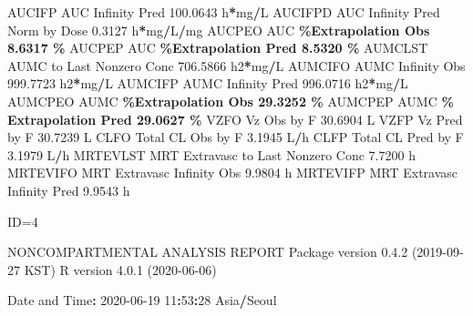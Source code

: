 \documentclass[
  10pt,
]{krantz}
\makeatletter
\newenvironment{Shaded}{\begin{snugshade}}{\end{snugshade}}
\newcommand{\DecValTok}[1]{\textcolor[rgb]{0.00,0.00,0.81}{#1}}
\newcommand{\FloatTok}[1]{\textcolor[rgb]{0.00,0.00,0.81}{#1}}
\newcommand{\NormalTok}[1]{#1}
\newcommand{\OperatorTok}[1]{\textcolor[rgb]{0.81,0.36,0.00}{\textbf{#1}}}
\newcommand{\StringTok}[1]{\textcolor[rgb]{0.31,0.60,0.02}{#1}}
\newenvironment{kframe}{%
\medskip{}
\setlength{\fboxsep}{.8em}
 \def\at@end@of@kframe{}%
 \ifinner\ifhmode%
  \def\at@end@of@kframe{\end{minipage}}%
  \begin{minipage}{\columnwidth}%
 \fi\fi%
 \def\FrameCommand##1{\hskip\@totalleftmargin \hskip-\fboxsep
 \colorbox{shadecolor}{##1}\hskip-\fboxsep
     \hskip-\linewidth \hskip-\@totalleftmargin \hskip\columnwidth}%
 \MakeFramed {\advance\hsize-\width
   \@totalleftmargin\z@ \linewidth\hsize
   \@setminipage}}%
 {\par\unskip\endMakeFramed%
 \at@end@of@kframe}
\renewenvironment{Shaded}{\begin{kframe}}{\end{kframe}}
\makeatother
\begin{document}
\begin{Shaded}
\begin{Highlighting}[]
\NormalTok{AUCIFP     AUC Infinity Pred                             }\FloatTok{100.0643}\NormalTok{ h}\OperatorTok{*}\NormalTok{mg}\OperatorTok{/}\NormalTok{L}
\NormalTok{AUCIFPD    AUC Infinity Pred Norm by Dose                  }\FloatTok{0.3127}\NormalTok{ h}\OperatorTok{*}\NormalTok{mg}\OperatorTok{/}\NormalTok{L}\OperatorTok{/}\NormalTok{mg}
\NormalTok{AUCPEO     AUC }\OperatorTok{\%Extrapolation Obs                          8.6317 \%}
\NormalTok{AUCPEP     AUC }\OperatorTok{\%Extrapolation Pred                         8.5320 \%}
\NormalTok{AUMCLST    AUMC to Last Nonzero Conc                     }\FloatTok{706.5866}\NormalTok{ h2}\OperatorTok{*}\NormalTok{mg}\OperatorTok{/}\NormalTok{L}
\NormalTok{AUMCIFO    AUMC Infinity Obs                             }\FloatTok{999.7723}\NormalTok{ h2}\OperatorTok{*}\NormalTok{mg}\OperatorTok{/}\NormalTok{L}
\NormalTok{AUMCIFP    AUMC Infinity Pred                            }\FloatTok{996.0716}\NormalTok{ h2}\OperatorTok{*}\NormalTok{mg}\OperatorTok{/}\NormalTok{L}
\NormalTok{AUMCPEO    AUMC }\OperatorTok{\%Extrapolation Obs                        29.3252 \%}
\NormalTok{AUMCPEP    AUMC }\OperatorTok{\% Extrapolation Pred                      29.0627 \%}
\NormalTok{VZFO       Vz Obs by F                                    }\FloatTok{30.6904}\NormalTok{ L}
\NormalTok{VZFP       Vz Pred by F                                   }\FloatTok{30.7239}\NormalTok{ L}
\NormalTok{CLFO       Total CL Obs by F                               }\FloatTok{3.1945}\NormalTok{ L}\OperatorTok{/}\NormalTok{h}
\NormalTok{CLFP       Total CL Pred by F                              }\FloatTok{3.1979}\NormalTok{ L}\OperatorTok{/}\NormalTok{h}
\NormalTok{MRTEVLST   MRT Extravasc to Last Nonzero Conc              }\FloatTok{7.7200}\NormalTok{ h}
\NormalTok{MRTEVIFO   MRT Extravasc Infinity Obs                      }\FloatTok{9.9804}\NormalTok{ h}
\NormalTok{MRTEVIFP   MRT Extravasc Infinity Pred                     }\FloatTok{9.9543}\NormalTok{ h}





\NormalTok{ID=}\DecValTok{4}

\NormalTok{                        NONCOMPARTMENTAL ANALYSIS REPORT}
\NormalTok{                       Package version }\DecValTok{0}\NormalTok{.}\FloatTok{4.2}\NormalTok{ (}\DecValTok{2019{-}09{-}27}\NormalTok{ KST)}
\NormalTok{                          R version }\DecValTok{4}\NormalTok{.}\FloatTok{0.1}\NormalTok{ (}\DecValTok{2020{-}06{-}06}\NormalTok{)}

\NormalTok{Date and Time}\OperatorTok{:}\StringTok{ }\DecValTok{2020{-}06{-}19} \DecValTok{11}\OperatorTok{:}\DecValTok{53}\OperatorTok{:}\DecValTok{28}\NormalTok{ Asia}\OperatorTok{/}\NormalTok{Seoul}


\end{Highlighting}
\end{Shaded}
\end{document}
